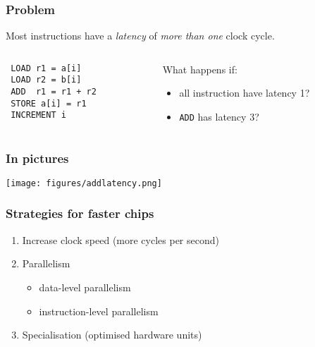 \documentclass[dvipsnames,presentation,aspectratio=169,14pt]{beamer}
\begin{document}
\begin{frame}[fragile]
  \frametitle{Problem}
  Most instructions have a \emph{latency} of \emph{more than one} clock cycle.
  \vskip 11pt
  \begin{columns}
    \begin{column}{0.4\textwidth}
\begin{verbatim}
 LOAD r1 = a[i]
 LOAD r2 = b[i]
 ADD  r1 = r1 + r2
 STORE a[i] = r1
 INCREMENT i
\end{verbatim}
    \end{column}
    \begin{column}{0.6\textwidth}
      What happens if:\\[7pt]
      \begin{itemize}[itemsep=7pt]
      \item all instruction have latency 1?


      \item \texttt{ADD} has latency 3?

      \end{itemize}
    \end{column}
  \end{columns}
\end{frame}

\begin{frame}
  \frametitle{In pictures}
  \begin{center}
    \texttt{[image: figures/addlatency.png]}
  \end{center}
\end{frame}

\begin{frame}
  \frametitle{Strategies for faster chips}
  \begin{enumerate}[itemsep=8pt]
  \item Increase clock speed (more cycles per second)
  \item Parallelism
    \begin{itemize}[itemsep=5pt]
    \item data-level parallelism
    \item instruction-level parallelism
    \end{itemize}
  \item Specialisation (optimised hardware units)
  \end{enumerate}
\end{frame}
\end{document}
